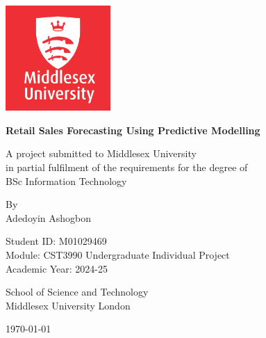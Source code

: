 \documentclass[12pt,a4paper]{report}
\begin{document}
\begin{titlepage}
\begin{center}

\includegraphics[width=0.3\textwidth,keepaspectratio]{187299.png}
\vspace{1.5cm}

{\LARGE\bfseries Retail Sales Forecasting Using Predictive Modelling\par}
\vspace{1.5cm}

{\large A project submitted to Middlesex University\\
in partial fulfilment of the requirements for the degree of\\
BSc Information Technology\par}
\vspace{1.5cm}

{\large By\\
Adedoyin Ashogbon\par}
\vspace{0.8cm}

{\large Student ID: M01029469\\
Module: CST3990 Undergraduate Individual Project\\
Academic Year: 2024-25\par}
\vspace{1.5cm}

{\large School of Science and Technology\\
Middlesex University London\par}
\vspace{0.8cm}

{\large \today\par}

\end{center}
\end{titlepage}
\end{document}
